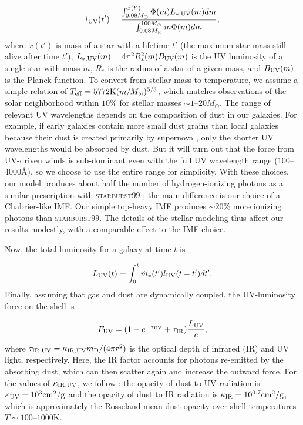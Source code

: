 \documentclass[a4paper,11pt]{article}
\begin{document}
\begin{equation}
    l_{\rm UV} (t') = \frac{\int^{x(t')}_{0.08 M_{\odot}} \Phi(m) L_{\rm *, UV} (m) dm}{\int^{100 M_{\odot}}_{0.08 M_{\odot}} m \Phi(m) dm}, \label{eq:luv}
\end{equation}
%
where $x(t')$ is mass of a star with a lifetime $t'$ (the maximum star mass still alive after time $t'$), $L_{\rm *, UV}(m)  = 4 \pi^{2} R_{*}^{2} (m) B_{\rm UV} (m)$ is the UV luminosity of a single star with mass $m$, $R_{*}$ is the radius of a star of a given mass, and $B_{\rm UV} (m)$ is the Planck function. To convert from stellar mass to temperature, we assume a simple relation of $T_{\rm eff} = 5772\mathrm{K}(m/M_{\odot})^{5/8}$, which matches observations of the solar neighborhood \cite{Eker2018} within $10\%$ for stellar masses $\sim 1$--$20 M_{\odot}$.
The range of relevant UV wavelengths depends on the composition of dust in our galaxies. For example, if early galaxies contain more small dust grains than local galaxies because their dust is created primarily by supernova \cite{Narayanan2025_dustsize}, only the shorter UV wavelengths would be absorbed by dust. But it will turn out that the force from UV-driven winds is sub-dominant even with the full UV wavelength range ($100$--$4000$\r{A}), so we choose to use the entire range for simplicity. With these choices, our model produces about half the number of hydrogen-ionizing photons as a similar prescription with \textsc{starburst99} \cite{Leitherer1999_starburst99}; the main difference is our choice of a Chabrier-like IMF. Our simple top-heavy IMF produces $\sim 20 \%$ more ionizing photons than \textsc{starburst99}. The details of the stellar modeling thus affect our results modestly, with a comparable effect to the IMF choice.

Now, the total luminosity for a galaxy at time $t$ is

\begin{equation}
    L_{\rm UV} (t) = \int^{t}_{0} \dot{m}_{*}(t') l_{\rm UV}(t - t') dt'.
\end{equation}
%
Finally, assuming that gas and dust are dynamically coupled, the UV-luminosity force on the shell is

\begin{equation}
    F_{\rm UV} = (1 - e^{-\tau_{\rm UV}} + \tau_{\rm IR} ) \frac{L_{\rm UV}}{c},
\end{equation}
%
where $\tau_{\rm IR, UV} = \kappa_{\rm IR, UV} m_{\rm D} / (4 \pi r^{2})$ is the optical depth of infrared (IR) and UV light, respectively. Here, the IR factor accounts for photons re-emitted by the absorbing dust, which can then scatter again and increase the outward force. For the values of $\kappa_{\rm IR, UV}$, we follow \cite{Thompson2015}: the opacity of dust to UV radiation is $\kappa_{\rm UV} = 10^{3} \rm cm^{2}/g$ and the opacity of dust to IR radiation is 
$\kappa_{\rm IR} = 10^{0.7} \rm cm^{2}/g$, which is
approximately the Rosseland-mean dust opacity over shell temperatures $T \sim 100$--$1000$K. 
\end{document}
